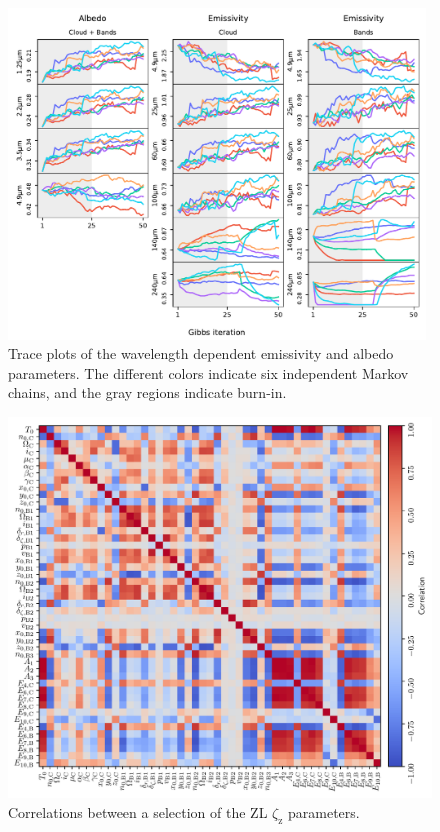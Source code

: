 \documentclass[twocolumn]{aa}
\begin{document}
\begin{figure}
    \centering
    \includegraphics[width=0.985\textwidth]{figs/emissivity_and_albedo_trace.pdf}
    \caption{Trace plots of the wavelength dependent emissivity and albedo parameters. The different colors indicate six independent Markov chains, and the gray regions indicate burn-in.}
    \label{fig:trace-emissivity-albedo}
\end{figure}

\begin{figure}
    \centering
    \includegraphics[width=1\textwidth]{figs/correlation_matrix.pdf}
    \caption{Correlations between a selection of the ZL $\zeta_{\mathrm{z}}$ parameters.}
    \label{fig:correlations}
\end{figure}
\end{document}
